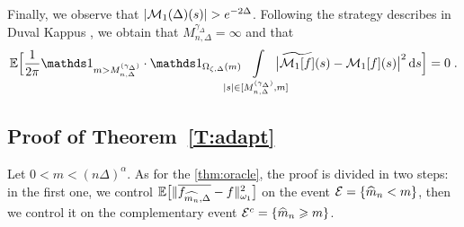 Finally, we observe that $|\Mcal_1(\Delta)(s)|> e^{-2\Delta}$. Following the strategy describes in Duval Kappus \cite{duval2019adaptive}, we obtain that $M_{n, \Delta}^{\gamma_\Delta} = \infty$ and that 
\begin{equation*}
    \EE \Big[\frac{1}{2\pi} \ind{m > M_{n, \Delta}^{(\gamma_\Delta)}} \cdot \ind{\Omega_{\zeta, \Delta}(m)} \hspace{-0.5cm} \int_{|s| \in [M_{n, \Delta}^{(\gamma_\Delta)}, m ]} \limits\hspace{-0.5cm} \big|  \tilde{\Mcal_1[f]}(s) -  \Mcal_1[f](s) \big|^2 \diff s \Big]
    = 0
    \eqfinp
\end{equation*}

\subsection{Proof of Theorem~\ref{T:adapt}}

Let $0 < m < (n\Delta)^\alpha$. As for the \cref{thm:oracle}, the proof is divided in two steps: in the first one, we control $\mathbb{E} \big[ \|\overline{f_{\widehat{m_n}, \Delta}}  - f \|_{\omega_1}^2\big]$ on the event $\mathcal{E} = \{ \widehat m_n < m\}$, then we control it on the complementary event $\mathcal{E}^c = \{ \widehat m_n \geqslant m\}$.\\ 

